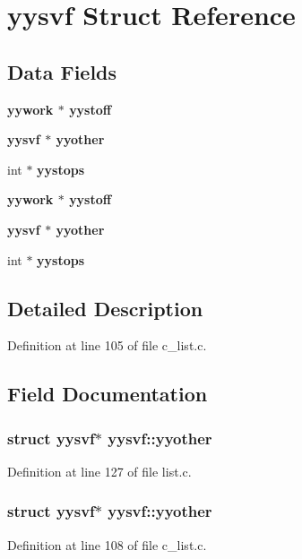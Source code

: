 \section{yysvf Struct Reference}
\label{structyysvf}
\subsection*{Data Fields}
\begin{CompactItemize}
\item 
\bf{yywork} $\ast$ \bf{yystoff}
\item 
\bf{yysvf} $\ast$ \bf{yyother}
\item 
int $\ast$ \bf{yystops}
\item 
\bf{yywork} $\ast$ \bf{yystoff}
\item 
\bf{yysvf} $\ast$ \bf{yyother}
\item 
int $\ast$ \bf{yystops}
\end{CompactItemize}


\subsection{Detailed Description}




Definition at line 105 of file c\_\-list.c.

\subsection{Field Documentation}
\subsubsection{\setlength{\rightskip}{0pt plus 5cm}struct \bf{yysvf}$\ast$ \bf{yysvf::yyother}}\label{structyysvf_ca8613db27a942dc2dcd1993b2a17f28}




Definition at line 127 of file list.c.
\subsubsection{\setlength{\rightskip}{0pt plus 5cm}struct \bf{yysvf}$\ast$ \bf{yysvf::yyother}}\label{structyysvf_ca8613db27a942dc2dcd1993b2a17f28}




Definition at line 108 of file c\_\-list.c.

